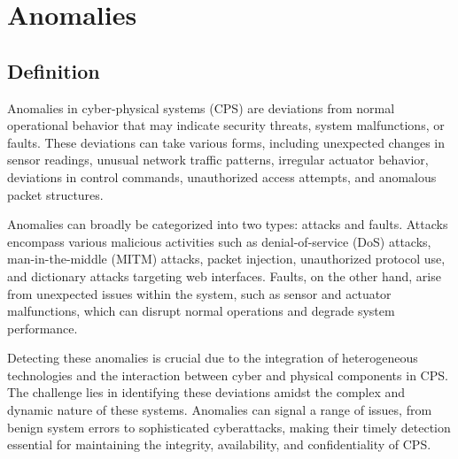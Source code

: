 \section{Anomalies}
\subsection{Definition}
Anomalies in cyber-physical systems (CPS) are deviations from normal operational behavior that may indicate security threats, system malfunctions, or faults. These deviations can take various forms, including unexpected changes in sensor readings, unusual network traffic patterns, irregular actuator behavior, deviations in control commands, unauthorized access attempts, and anomalous packet structures\cite{14,20}.

Anomalies can broadly be categorized into two types: attacks and faults. Attacks encompass various malicious activities such as denial-of-service (DoS) attacks, man-in-the-middle (MITM) attacks, packet injection, unauthorized protocol use, and dictionary attacks targeting web interfaces\cite{13,15}. Faults, on the other hand, arise from unexpected issues within the system, such as sensor and actuator malfunctions, which can disrupt normal operations and degrade system performance\cite{15,18}.

Detecting these anomalies is crucial due to the integration of heterogeneous technologies and the interaction between cyber and physical components in CPS\cite{16}. The challenge lies in identifying these deviations amidst the complex and dynamic nature of these systems. Anomalies can signal a range of issues, from benign system errors to sophisticated cyberattacks, making their timely detection essential for maintaining the integrity, availability, and confidentiality of CPS\cite{17,19}.
